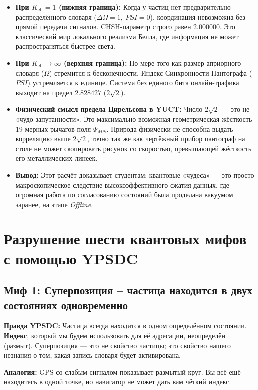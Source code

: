 \documentclass[12pt,a4paper]{article}
\begin{document}
	\begin{itemize}
		\item \textbf{При \(K_{\mathrm{eff}} = 1\) (нижняя граница):}  
		Когда у частиц нет предварительно распределённого словаря (\(\Delta\Omega = 1,\ PSI = 0\)), координация невозможна без прямой передачи сигналов. CHSH-параметр строго равен \(2.000000\). Это классический мир локального реализма Белла, где информация не может распространяться быстрее света.
		
		\item \textbf{При \(K_{\mathrm{eff}} \to \infty\) (верхняя граница):}  
		По мере того как размер априорного словаря (\(\Omega\)) стремится к бесконечности, Индекс Синхронности Пантографа (\(PSI\)) устремляется к единице. Система без единого бита онлайн‑трафика выходит на предел \(2.828427\) (\(2\sqrt{2}\)).
		
		\item \textbf{Физический смысл предела Цирельсона в YUCT:}  
		Число \(2\sqrt{2}\) — это не «чудо запутанности». Это максимально возможная геометрическая жёсткость 19‑мерных рычагов поля \(\Psi_{MN}\). Природа физически не способна выдать корреляцию выше \(2\sqrt{2}\), точно так же как чертёжный прибор пантограф на столе не может скопировать рисунок со скоростью, превышающей жёсткость его металлических линеек.
		
		\item \textbf{Вывод:}  
		Этот расчёт доказывает студентам: квантовые «чудеса» — это просто макроскопическое следствие высокоэффективного сжатия данных, где огромная работа по согласованию состояний была проделана вакуумом заранее, на этапе \textit{Offline}.
	\end{itemize}
	
	
	\section{Разрушение шести квантовых мифов с помощью YPSDC}
	
	\subsection{Миф 1: Суперпозиция – частица находится в двух состояниях одновременно}
	\textbf{Правда YPSDC:} Частица всегда находится в одном определённом состоянии. \textbf{Индекс}, который мы будем использовать для её адресации, неопределён (размыт). Суперпозиция — это не свойство частицы; это свойство нашего незнания о том, какая запись словаря будет активирована.
	\par
	\textbf{Аналогия:} GPS со слабым сигналом показывает размытый круг. Вы всё ещё находитесь в одной точке, но навигатор не может дать вам чёткий индекс.
	
\end{document}
